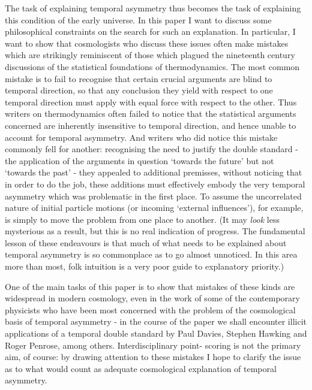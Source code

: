 \documentclass{article}
\begin{document}
The task of explaining temporal asymmetry thus becomes the task of
explaining this condition of the early universe. In this paper I want to
discuss some philosophical constraints on the search for such an
explanation. In particular, I want to show that cosmologists who discuss
these issues often make mistakes which are strikingly reminiscent of
those which plagued the nineteenth century discussions of the
statistical foundations of thermodynamics. The most common mistake is to
fail to recognise that certain crucial arguments are blind to temporal
direction, so that any conclusion they yield with respect to one
temporal direction must apply with equal force with respect to the
other. Thus writers on thermodynamics often failed to notice that the
statistical arguments concerned are inherently insensitive to temporal
direction, and hence unable to account for temporal asymmetry. And
writers who did notice this mistake commonly fell for another:
recognising the need to justify the double standard - the application of
the arguments in question `towards the future' but not `towards the
past' - they appealed to additional premisses, without noticing that in
order to do the job, these additions must effectively embody the very
temporal asymmetry which was problematic in the first place. To assume
the uncorrelated nature of initial particle motions (or incoming
`external influences'), for example, is simply to move the problem from
one place to another. (It may \emph{look} less mysterious as a result,
but this is no real indication of progress. The fundamental lesson of
these endeavours is that much of what needs to be explained about
temporal asymmetry is so commonplace as to go almost unnoticed. In this
area more than most, folk intuition is a very poor guide to explanatory
priority.)

One of the main tasks of this paper is to show that mistakes of these
kinds are widespread in modern cosmology, even in the work of some of
the contemporary physicists who have been most concerned with the
problem of the cosmological basis of temporal asymmetry - in the course
of the paper we shall encounter illicit applications of a temporal
double standard by Paul Davies, Stephen Hawking and Roger Penrose, among
others. Interdisciplinary point- scoring is not the primary aim, of
course: by drawing attention to these mistakes I hope to clarify the
issue as to what would count as adequate cosmological explanation of
temporal asymmetry.
\end{document}
